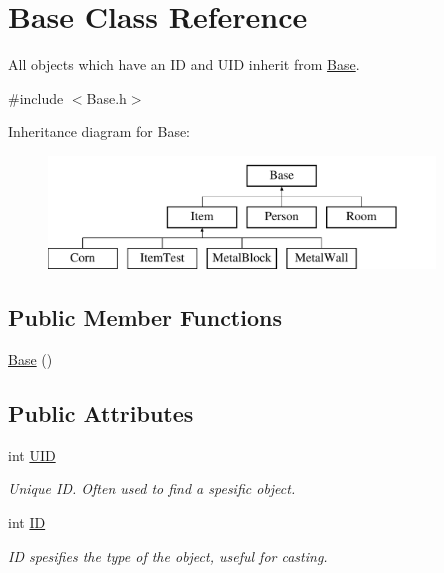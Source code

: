 \hypertarget{classBase}{\section{Base Class Reference}
\label{classBase}
}


All objects which have an I\-D and U\-I\-D inherit from \hyperlink{classBase}{Base}.  




{\ttfamily \#include $<$Base.\-h$>$}

Inheritance diagram for Base\-:\begin{figure}[H]
\begin{center}
\leavevmode
\includegraphics[height=3.000000cm]{classBase}
\end{center}
\end{figure}
\subsection*{Public Member Functions}
\begin{DoxyCompactItemize}
\item 
\hyperlink{classBase_a5ffe0568374d8b9b4c4ec32953fd6453}{Base} ()
\end{DoxyCompactItemize}
\subsection*{Public Attributes}
\begin{DoxyCompactItemize}
\item 
int \hyperlink{classBase_ac25c86b1d7bb8304fc0a81b8bddf7faf}{U\-I\-D}
\begin{DoxyCompactList}\small\item\em Unique I\-D. Often used to find a spesific object. \end{DoxyCompactList}\item 
int \hyperlink{classBase_a1dddc037afe2eae3e1364597e6a3cf46}{I\-D}
\begin{DoxyCompactList}\small\item\em I\-D spesifies the type of the object, useful for casting. \end{DoxyCompactList}\end{DoxyCompactItemize}


